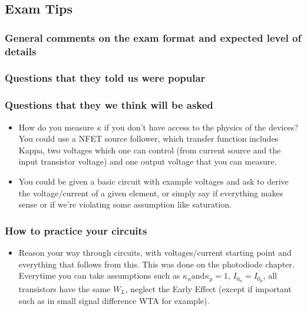 \subsection{Exam Tips}
\subsubsection{General comments on the exam format and expected level of details}
\subsubsection{Questions that they told us were popular}
\subsubsection{Questions that they we think will be asked}
\begin{itemize}
    \item How do you measure $\kappa$ if you don't have access to the physics of the devices? \\
    You could use a NFET source follower, which transfer function includes Kappa, two voltages which one can control (from current source and the input transistor voltage) and one output voltage that you can measure. 
    \item You could be given a basic circuit with example voltages and ask to derive the voltage/current of a given element, or simply say if everything makes sense or if we're violating some assumption like saturation.
\end{itemize}
\subsubsection{How to practice your circuits}
\begin{itemize}
    \item Reason your way through circuits, with voltages/current starting point and everything that follows from this. This was done on the photodiode chapter. Everytime you can take assumptions such as $\kappa_n \mathrm{and} \kappa_p = 1$, $I_0_n = I_0_p$, all transistors have the same $W_L$, neglect the Early Effect (except if important such as in small signal difference WTA for example).  
\end{itemize}

